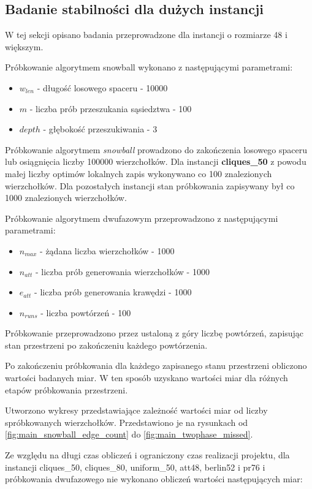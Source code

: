 \newpage

\subsection{Badanie stabilności dla dużych instancji}
W tej sekcji opisano badania przeprowadzone dla instancji o rozmiarze 48 i większym.

Próbkowanie algorytmem snowball wykonano z następującymi parametrami:
\begin{itemize}
    \item $w_{len}$ - długość losowego spaceru - 10000
    \item $m$ - liczba prób przeszukania sąsiedztwa - 100
    \item $depth$ - głębokość przeszukiwania - 3
\end{itemize}

Próbkowanie algorytmem \textit{snowball} prowadzono do zakończenia losowego spaceru lub osiągnięcia liczby 100000 wierzchołków.
Dla instancji \textbf{cliques\_50} z powodu małej liczby optimów lokalnych zapis wykonywano co 100 znalezionych wierzchołków.
Dla pozostałych instancji stan próbkowania zapisywany był co 1000 znalezionych wierzchołków.

Próbkowanie algorytmem dwufazowym przeprowadzono z następującymi parametrami:
\begin{itemize}
    \item $n_{max}$ - żądana liczba wierzchołków - 1000
    \item $n_{att}$ - liczba prób generowania wierzchołków - 1000
    \item $e_{att}$ - liczba prób generowania krawędzi - 1000
    \item $n_{runs}$ - liczba powtórzeń - 100
\end{itemize}

Próbkowanie przeprowadzono przez ustaloną z góry liczbę powtórzeń, zapisując stan przestrzeni po zakończeniu każdego powtórzenia.

Po zakończeniu próbkowania dla każdego zapisanego stanu przestrzeni obliczono wartości badanych miar. W ten sposób uzyskano
wartości miar dla różnych etapów próbkowania przestrzeni.

Utworzono wykresy przedstawiające zależność wartości miar od liczby spróbkowanych wierzchołków.
Przedstawiono je na rysunkach od \ref{fig:main_snowball_edge_count} do \ref{fig:main_twophase_missed}.

Ze względu na długi czas obliczeń i ograniczony czas realizacji projektu,
dla instancji cliques\_50, cliques\_80, uniform\_50, att48, berlin52 i pr76 i próbkowania dwufazowego
nie wykonano obliczeń wartości następujących miar:

